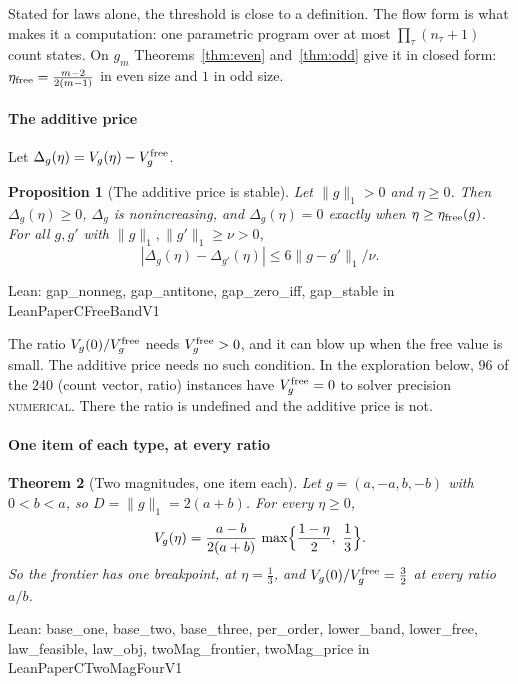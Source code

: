 \documentclass[conference]{IEEEtran}
\newtheorem{theorem}{Theorem}
\newtheorem{proposition}[theorem]{Proposition}
\theoremstyle{definition}
\newcommand{\lean}[1]{\textsf{\footnotesize #1}}
\newcommand{\leanbox}[1]{%
  \par\vspace{2pt}\noindent
  {\raggedright\footnotesize\textsf{Lean: #1}\par}\vspace{2pt}}
\newcommand{\NUM}{\textsc{numerical}}
\begin{document}
Stated for laws alone, the threshold is close to a definition. The flow form is what makes it a
computation: one parametric program over at most $\prod_\tau(n_\tau+1)$ count states. On
$g_m$ Theorems~\ref{thm:even} and~\ref{thm:odd} give it in closed form:
$\eta_{\rm free}=\frac{m-2}{2(m-1)}$ in even size and $1$ in odd size.

\paragraph{The additive price} Let $\Delta_g(\eta)=V_g(\eta)-V^{\rm free}_g$.

\begin{proposition}[The additive price is stable]
\label{prop:gap}
Let $\|g\|_1>0$ and $\eta\ge0$. Then $\Delta_g(\eta)\ge0$, $\Delta_g$ is nonincreasing, and
$\Delta_g(\eta)=0$ exactly when $\eta\ge\eta_{\rm free}(g)$. For all $g,g'$ with
$\|g\|_1,\|g'\|_1\ge\nu>0$,
\[
|\Delta_g(\eta)-\Delta_{g'}(\eta)|\le6\|g-g'\|_1/\nu.
\]
\end{proposition}
\leanbox{\lean{gap\_nonneg}, \lean{gap\_antitone}, \lean{gap\_zero\_iff}, \lean{gap\_stable} in
\lean{LeanPaperCFreeBandV1}}

The ratio $V_g(0)/V^{\rm free}_g$ needs $V^{\rm free}_g>0$, and it can blow up when the free
value is small. The additive price needs no such condition. In the exploration below, $96$ of the
$240$ (count vector, ratio) instances have $V^{\rm free}_g=0$ to solver precision \NUM. There the ratio is undefined and the
additive price is not.

\paragraph{One item of each type, at every ratio}
\begin{theorem}[Two magnitudes, one item each]
\label{thm:twomag}
Let $g=(a,-a,b,-b)$ with $0<b<a$, so $D=\|g\|_1=2(a+b)$. For every $\eta\ge0$,
\[
V_g(\eta)=\frac{a-b}{2(a+b)}\,\max\Bigl\{\frac{1-\eta}2,\ \frac13\Bigr\}.
\]
So the frontier has one breakpoint, at $\eta=\frac13$, and $V_g(0)/V_g^{\rm free}=\frac32$ at
every ratio $a/b$.
\end{theorem}
\leanbox{\lean{base\_one}, \lean{base\_two}, \lean{base\_three}, \lean{per\_order},
\lean{lower\_band}, \lean{lower\_free}, \lean{law\_feasible}, \lean{law\_obj},
\lean{twoMag\_frontier}, \lean{twoMag\_price} in \lean{LeanPaperCTwoMagFourV1}}
\end{document}
